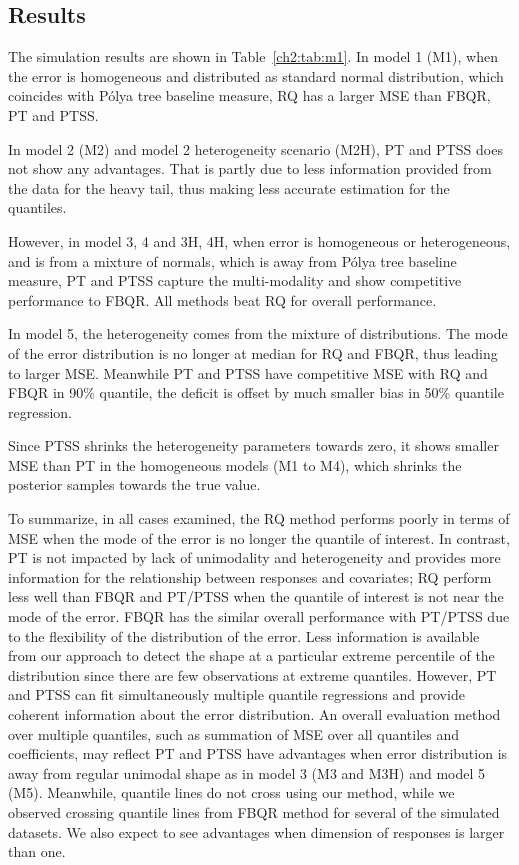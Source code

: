 \documentclass[12pt]{article}
\newcommand{\polya}{P\'{o}lya}
\begin{document}
\subsection{Results}
The simulation results are shown in Table~\ref{ch2:tab:m1}.
In model 1 (M1), when the error is homogeneous and distributed as standard normal distribution, which coincides with \polya{} tree baseline measure, RQ has a larger MSE than FBQR, PT and PTSS.

In model 2 (M2) and model 2 heterogeneity scenario (M2H), PT and PTSS does not show any advantages.
That is partly due to less information provided from the data for the heavy tail, thus making less accurate estimation for the quantiles.

However, in model 3, 4 and 3H, 4H, when error is homogeneous or heterogeneous, and is from a mixture of normals, which is away from \polya{} tree baseline measure,
PT and PTSS capture the multi-modality and show competitive performance to FBQR.  All methods beat RQ for overall performance.

In model 5, the heterogeneity comes from the mixture of distributions.
The mode of the error distribution is no longer at median for RQ and FBQR, thus leading to larger MSE.
Meanwhile PT and PTSS have competitive MSE with RQ and FBQR in 90\% quantile, the deficit is offset by much smaller bias in 50\% quantile regression.

Since PTSS shrinks the heterogeneity parameters towards zero, it shows smaller MSE than PT in the homogeneous models (M1 to M4), which shrinks the posterior samples towards the true value.

To summarize, in all cases examined, the RQ method performs poorly in terms of MSE when the mode of the error is no longer the quantile of interest.
In contrast, PT is not impacted by lack of unimodality and heterogeneity and provides more information for the relationship between responses and covariates;
RQ perform less well than FBQR and PT/PTSS when the quantile of interest is not near the mode of the error.
FBQR has the similar overall performance with PT/PTSS due to the flexibility of the distribution of the error.
Less information is available from our approach to detect the shape at a particular extreme percentile of the distribution since there are few observations at extreme quantiles.
However, PT and PTSS can fit simultaneously multiple quantile regressions and provide coherent information about the error distribution.
An overall evaluation method over multiple quantiles, such as summation of MSE over all quantiles and coefficients, may reflect PT and PTSS have advantages when error distribution is away from regular unimodal shape as in model 3 (M3 and M3H) and model 5 (M5).
Meanwhile, quantile lines do not cross using our method, while we observed crossing quantile lines from FBQR method for several of the simulated datasets.
We also expect to see advantages when dimension of responses is larger than one.
\end{document}

